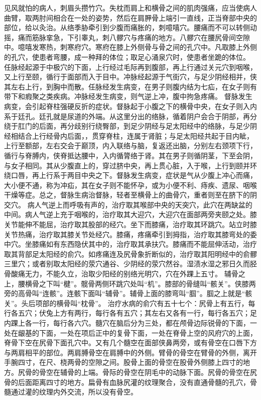 \documentclass[a4paper,12pt,UTF8,twoside]{ctexbook}
\begin{document}
见风就怕的病人，刺眉头攒竹穴。失枕而肩上和横骨之间的肌肉强痛，应当使病人曲臂，取两肘间相合在一处的姿势，然后在肩胛骨上端引一直线，正当脊部中央的部位，给以灸治。从络季胁牵引到少腹而痛胀的，刺噫嘻穴。腰痛而不可以转侧动摇，痛而筋脉挛急，下引睾丸，刺八髎穴与疼痛的地方。八髎穴在腰尻骨间空隙中。噫嘻发寒热，刺寒府穴。寒府在膝上外侧骨与骨之间的孔穴中。凡取膝上外侧的孔穴，使患者弯腰，成一种拜的体位；取足心涌泉穴时，使患者坐跪的体位。
任脉经起源于中极穴的下面，上行经过毛际再到腹部，再上行通过关元穴到咽喉，又上行至颐，循行于面部而入于目中。冲脉经起源于气街穴，与足少阴经相并，侠其左右上行，到胸中而散。任脉经发生病变，在男子则腹内结为七疝，在女子则有带下和瘕聚之类疾病。冲脉经发生病变，则气逆上冲，腹中拘急疼痛。
督脉发生病变，会引起脊柱强硬反折的症状。督脉起于小腹之下的横骨中央，在女子则入内系于廷孔。廷孔就是尿道的外端。从这里分出的络脉，循着阴户会合于阴部，再分绕于肛门的后面，再分歧别行绕臀部，到足少阴经与足太阳经中的络脉，与足少阴经相结合上行经骨内后面，，贯穿脊柱，连属于肾脏；与足太阳经共起于目内眦，上行至额部，左右交会于巅顶，内入联络与脑，复返还出脑，分别左右颈项下行，循行与脊膊内，侠脊抵达腰中，入内循膂络于肾。其在男子则循阴茎，下至会阴，与女子相同。其从少腹直上的，穿过脐中央，再上贯心脏，入于喉，上行到颐并环绕口唇，再上行系于两目中央之下。督脉发生病变，症状是气从少腹上冲心而痛，大小便不通，称为冲疝，其在女子则不能怀孕，或为小便不利、痔疾、遗尿、咽喉干燥等症。总之，督脉生病治督脉，轻者至横骨上的曲骨穴，重者则至在脐下的阴交穴。
病人气逆上而呼吸有声的，治疗取其喉部中央的天突穴，此穴在两缺盆的中间。病人气逆上充于咽喉的，治疗取其大迎穴，大迎穴在面部两旁夹颐之处。膝关节能伸不能屈，治疗取其股部的经穴。坐下而膝痛，治疗取其环跳穴。站立时膝关节热痛，治疗取其膝关节处经穴。膝痛，疼痛牵引到拇指，治疗取其膝弯处的委中穴。坐膝痛如有东西隐伏其中的，治疗取其承扶穴。膝痛而不能屈伸活动，治疗取其背部足太阳经的俞穴。如疼痛连及尻骨象折断似的，治疗取其阳明经中的俞髎三里穴；或者别取太阳经的荥穴通谷、少阴经的荥穴然谷。湿渍水湿之邪日久而胫骨酸痛无力，不能久立，治取少阳经的别络光明穴，穴在外踝上五寸。
辅骨之上，腰横骨之下叫“楗”。髋骨两侧环跳穴处叫“机”。膝部的骨缝叫“骸关”。侠膝两旁的高骨叫“连骸”。连骸下面叫“辅骨”。辅骨上面的膝弯叫“腘”。腘之上就是“骸关”。头后项部的横骨叫“枕骨”。
治疗水病的俞穴有五十七个：尻骨上有五行，每行各五穴；伏兔上方有两行，每行各有五穴；其左右又各有一行，每行各五穴；足内踝上各一行，每行各六穴。髓穴在脑后分为三处，都在颅骨边际锐骨的下面，一处在龈基的下面，一处在项后正中的复骨下面，一处在脊骨上空的风府穴的上面，脊骨下空在尻骨下面孔穴中。又有几个髓空在面部侠鼻两旁，或有骨空在口唇下方与两肩相平的部位。两肩膊骨空在肩膊中的外侧。臂骨的骨空在臂骨的外侧，离开手腕四寸，在尺、桡两骨的空隙之间。股骨上面的骨空在股骨外侧膝上四寸的地方。尻骨的骨空在辅骨的上端。骨际的骨空在阴毛中的动脉下面。尻骨的骨空在尻骨的后面距离四寸的地方。扁骨有血脉尻灌的纹理聚合，没有直通骨髓的孔穴，骨髓通过灌的纹理内外交流，所以没有骨空。
\end{document}
